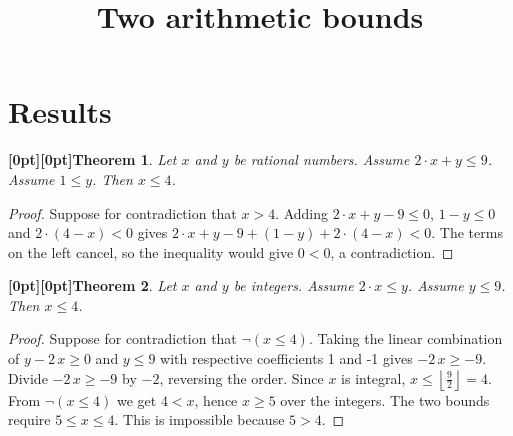 \documentclass{article}
\title{Two arithmetic bounds}
\author{}
\date{}
\makeatletter
\newcommand{\paperanchor}[1]{\hypertarget{#1}{}}%
\def\paperdest{\pdfextension dest}\def\paperstart{\pdfextension startlink}%
\def\paperend{\pdfextension endlink}\def\papercolor{\pdfextension colorstack}%
\let\paperdest\pdfdest\let\paperstart\pdfstartlink\let\paperend\pdfendlink\let\papercolor\pdfcolorstack
\newcommand{\paperanchor}[1]{\paperdest name{#1} xyz}%
\newcommand{\paperanchor}[1]{\special{pdf:dest (#1) [@thispage /XYZ null @ypos null]}}%
\newcommand{\paperlineanchor}[1]{\raisebox{10pt}[0pt][0pt]{\paperanchor{#1}}}
\DeclareRobustCommand{\paperresultname}[1]{\paperlineanchor{theorem:\arabic{theorem}}#1}
\theoremstyle{paperresult}
\newtheorem{theorem}{\paperresultname{Theorem}}
\makeatother
\begin{document}
\maketitle
\section{Results}
\begin{theorem}\label{theorem:1}
Let \(x\) and \(y\) be rational numbers. Assume \(2 \cdot x + y \le 9\). Assume \(1 \le y\). Then \(x \le 4\).
\end{theorem}

\begin{proof}
Suppose for contradiction that \(x > 4\).
Adding \(2 \cdot x + y - 9 \le 0\), \(1 - y \le 0\) and \(2 \cdot \left(4 - x\right) < 0\) gives \(2 \cdot x + y - 9 + \left(1 - y\right) + 2 \cdot \left(4 - x\right) < 0\).
The terms on the left cancel, so the inequality would give \(0 < 0\), a contradiction.
\end{proof}

\begin{theorem}\label{theorem:2}
Let \(x\) and \(y\) be integers. Assume \(2 \cdot x \le y\). Assume \(y \le 9\). Then \(x \le 4\).
\end{theorem}

\begin{proof}
Suppose for contradiction that \(\neg \left(x \le 4\right)\).
Taking the linear combination of \(y - 2\,x \ge 0\) and \(y \le 9\) with respective coefficients 1 and -1 gives \(-2\,x \ge -9\).
Divide \(-2\,x \ge -9\) by \(-2\), reversing the order. Since \(x\) is integral, \(x \le \left\lfloor\frac{9}{2}\right\rfloor = 4\).
From \(\neg \left(x \le 4\right)\) we get \(4 < x\), hence \(x \ge 5\) over the integers.
The two bounds require \(5 \le x \le 4\).
This is impossible because \(5 > 4\).
\end{proof}
\end{document}
